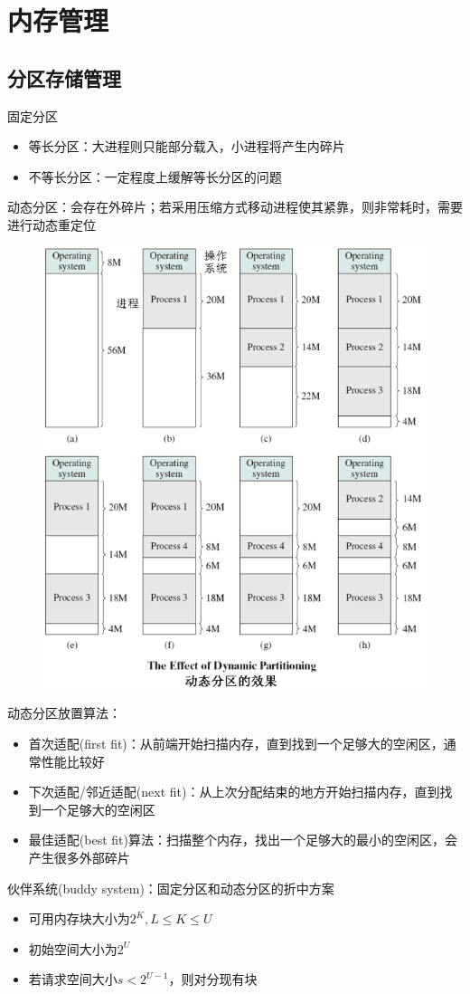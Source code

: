 
\section{内存管理}
\subsection{分区存储管理}
固定分区
\begin{itemize}
    \item 等长分区：大进程则只能部分载入，小进程将产生内碎片
    \item 不等长分区：一定程度上缓解等长分区的问题
\end{itemize}

动态分区：会存在外碎片；若采用压缩方式移动进程使其紧靠，则非常耗时，需要进行动态重定位
\begin{figure}[H]
    \centering
    \includegraphics[width=0.6\linewidth]{fig/dynamic_partition.png}
\end{figure}

动态分区放置算法：
\begin{itemize}
    \item 首次适配(first fit)：从前端开始扫描内存，直到找到一个足够大的空闲区，通常性能比较好
    \item 下次适配/邻近适配(next fit)：从上次分配结束的地方开始扫描内存，直到找到一个足够大的空闲区
    \item 最佳适配(best fit)算法：扫描整个内存，找出一个足够大的最小的空闲区，会产生很多外部碎片
\end{itemize}

伙伴系统(buddy system)：固定分区和动态分区的折中方案
\begin{itemize}
    \item 可用内存块大小为$2^K,L\leq K\leq U$
    \item 初始空间大小为$2^U$
    \item 若请求空间大小$s<2^{U-1}$，则对分现有块
\end{itemize}

